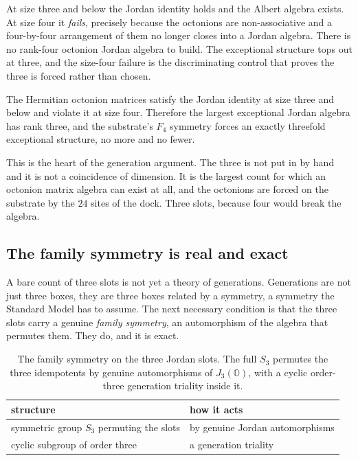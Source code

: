 At size three and below the Jordan identity holds and the Albert algebra exists. At size four it \emph{fails}, precisely because the octonions are non-associative and a four-by-four arrangement of them no longer closes into a Jordan algebra. There is no rank-four octonion Jordan algebra to build. The exceptional structure tops out at three, and the size-four failure is the discriminating control that proves the three is forced rather than chosen.

\begin{theorem}
The Hermitian octonion matrices satisfy the Jordan identity at size three and below and violate it at size four. Therefore the largest exceptional Jordan algebra has rank three, and the substrate's $F_4$ symmetry forces an exactly threefold exceptional structure, no more and no fewer.
\end{theorem}

This is the heart of the generation argument. The three is not put in by hand and it is not a coincidence of dimension. It is the largest count for which an octonion matrix algebra can exist at all, and the octonions are forced on the substrate by the $24$ sites of the dock. Three slots, because four would break the algebra.

\subsection{The family symmetry is real and exact}

A bare count of three slots is not yet a theory of generations. Generations are not just three boxes, they are three boxes related by a symmetry, a symmetry the Standard Model has to assume. The next necessary condition is that the three slots carry a genuine \emph{family symmetry}, an automorphism of the algebra that permutes them. They do, and it is exact.

\begin{table}[ht]
\centering
\begin{tabular}{@{}ll@{}}
\toprule
structure & how it acts \\
\midrule
symmetric group $S_3$ permuting the slots & by genuine Jordan automorphisms \\
cyclic subgroup of order three & a generation triality \\
\bottomrule
\end{tabular}
\caption{The family symmetry on the three Jordan slots. The full $S_3$ permutes the three idempotents by genuine automorphisms of $J_3(\mathbb{O})$, with a cyclic order-three generation triality inside it.}
\label{tab:family-symmetry}
\end{table}

